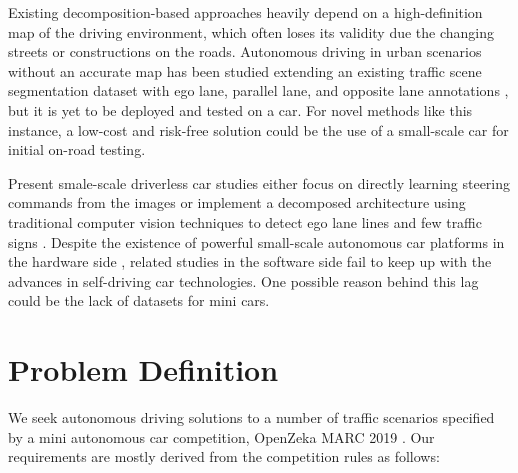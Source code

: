 Existing decomposition-based approaches heavily depend on a high-definition map
of the driving environment, which often loses its validity due the changing
streets or constructions on the roads. Autonomous driving in urban scenarios
without an accurate map has been studied extending an existing traffic scene
segmentation dataset with ego lane, parallel lane, and opposite lane
annotations \cite{cite9}, but it is yet to be deployed and tested on a car. For
novel methods like this instance, a low-cost and risk-free solution could be
the use of a small-scale car for initial on-road testing.

Present smale-scale driverless car studies either focus on directly learning
steering commands from the images \cite{Bechtel2017DeepPicarAL,
Do2018RealTimeSC} or implement a decomposed architecture using traditional
computer vision techniques to detect ego lane lines and few traffic signs
\cite{Blaga2018MiniatureAV}. Despite the existence of powerful small-scale
autonomous car platforms in the hardware side \cite{Karaman2017ProjectbasedCA},
related studies in the software side fail to keep up with the advances in
self-driving car technologies. One possible reason behind this lag could be the
lack of datasets for mini cars.


\section{Problem Definition}

We seek autonomous driving solutions to a number of traffic scenarios specified
by a mini autonomous car competition, OpenZeka MARC 2019 \cite{OpenZekaMARC}.
Our requirements are mostly derived from the competition rules as follows:

